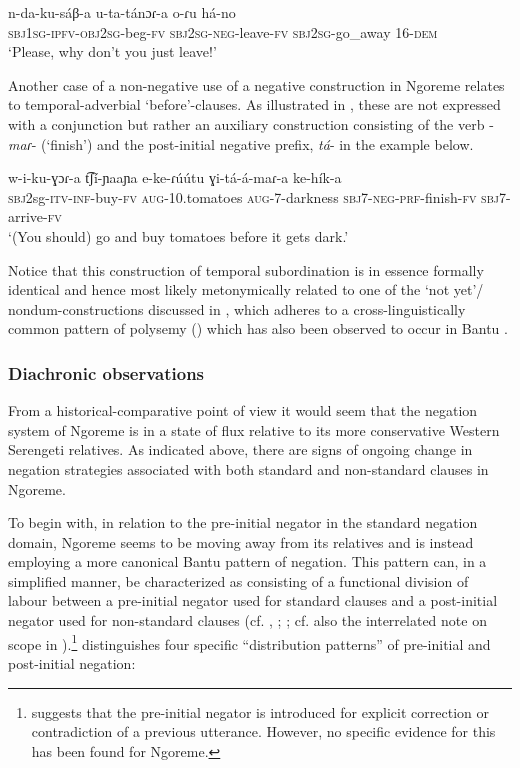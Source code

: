 \documentclass[output=paper,colorlinks,citecolor=brown,draftmode]{langscibook}
\begin{document}
\ea\label{ex:ngo:89} 
    \gll n-da-ku-sáβ{}-a u-ta-tánɔɾ{}-a o-ɾu há-no\\ 
        \textsc{sbj}1\textsc{sg}{}-\textsc{ipfv-obj}2\textsc{sg}{}-beg-\textsc{fv} \textsc{sbj}2\textsc{sg}{}-\textsc{neg}{}-leave-\textsc{fv} \textsc{sbj}2\textsc{sg}{}-go\_away 16-\textsc{dem}\\
 \glt ‘Please, why don’t you just leave!’
\z 

Another case of a non-negative use of a negative construction in Ngoreme relates to temporal-adverbial ‘before’-clauses. As illustrated in , these are not expressed with a conjunction but rather an auxiliary construction consisting of the verb \nobreakdash-\textit{maɾ}\nobreakdash- (‘finish’) and the post-initial negative prefix, \textit{tá}{}- in the example below.


\ea\label{ex:ngo:90} 
    \gll w-i-ku-ɣɔɾ{}-a t͡ʃí{}-ɲaaɲa e{}-ke-ɾúútu ɣi-tá-á{}-maɾ{}-a ke-hík-a \\ 
         \textsc{sbj}2sg-\textsc{itv-inf-}buy-\textsc{fv} \textsc{aug-}10.tomatoes \textsc{aug-}7-darkness \textsc{sbj}7-\textsc{neg-prf}{}-finish-\textsc{fv} \textsc{sbj}7-arrive-\textsc{fv}\\
     \glt ‘(You should) go and buy tomatoes before it gets dark.’
\z 

Notice that this construction of temporal subordination is in essence formally identical and hence most likely metonymically related to one of the ‘not yet’/ nondum-constructions discussed in , which adheres to a cross-linguis\-tically common pattern of polysemy (\citealt[275--276, 291]{Baar1997}) which has also been observed to occur in Bantu \citep{VeselinovaDevos2021}.

\subsubsection{Diachronic observations}\label{sec:ngo:4.8}

From a historical-comparative point of view it would seem that the negation system of Ngoreme is in a state of flux relative to its more conservative Western Serengeti relatives. As indicated above, there are signs of ongoing change in negation strategies associated with both standard and non-standard clauses in Ngoreme. 

To begin with, in relation to the pre-initial negator in the standard negation domain, Ngoreme seems to be moving away from its relatives and is instead employing a more canonical Bantu pattern of negation. This pattern can, in a simplified manner, be characterized as consisting of a functional division of labour between a pre-initial negator used for standard clauses and a post-initial negator used for non-standard clauses (cf. \citealt{Güldemann1996}, \citeyear{Güldemann1999}; \citealt[179--201]{Nurse2008}; cf. also the interrelated note on scope in ).\footnote{\citet{Güldemann1999} suggests that the pre-initial negator is introduced for explicit correction or contradiction of a previous utterance. However, no specific evidence for this has been found for Ngoreme.} \citet{Güldemann1999} distinguishes four specific “distribution patterns” of pre-initial and post-initial negation:
\end{document}

